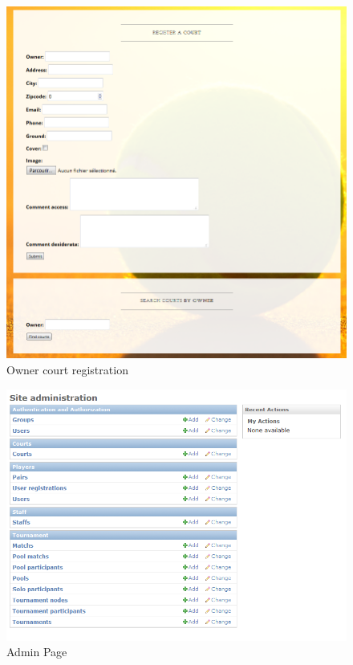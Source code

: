 \documentclass[a4paper, 12pt]{article}
\begin{document}
\begin{appendices}
\begin{figure}
\caption{\label{figure4} Owner court registration}
\includegraphics[scale=0.8]{site3.PNG}
\end{figure}

\begin{figure}
\caption{\label{figure5} Admin Page}
\includegraphics[scale=0.9]{site4.PNG}
\end{figure}


\end{appendices}
\end{document}
